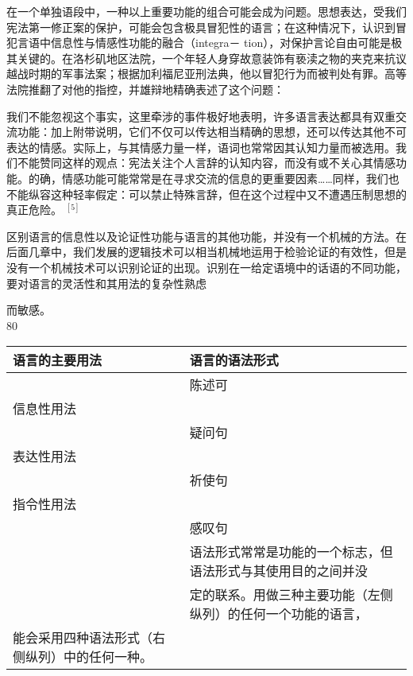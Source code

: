 在一个单独语段中，一种以上重要功能的组合可能会成为问题。思想表达，受我们宪法第一修正案的保护，可能会包含极具冒犯性的语言；在这种情况下，认识到冒犯言语中信息性与情感性功能的融合（integra－ tion），对保护言论自由可能是极其关键的。在洛杉矶地区法院，一个年轻人身穿故意装饰有亵渎之物的夹克来抗议越战时期的军事法案；根据加利福尼亚刑法典，他以冒犯行为而被判处有罪。高等法院推翻了对他的指控，并雄辩地精确表述了这个问题：

我们不能忽视这个事实，这里牵涉的事件极好地表明，许多语言表达都具有双重交流功能：加上附带说明，它们不仅可以传达相当精确的思想，还可以传达其他不可表达的情感。实际上，与其情感力量一样，语词也常常因其认知力量而被选用。我们不能赞同这样的观点：宪法关注个人言辞的认知内容，而没有或不关心其情感功能。的确，情感功能可能常常是在寻求交流的信息的更重要因素……同样，我们也不能纵容这种轻率假定：可以禁止特殊言辞，但在这个过程中又不遭遇压制思想的真正危险。 ${ }^{[5]}$

区别语言的信息性以及论证性功能与语言的其他功能，并没有一个机械的方法。在后面几章中，我们发展的逻辑技术可以相当机械地运用于检验论证的有效性，但是没有一个机械技术可以识别论证的出现。识别在一给定语境中的话语的不同功能，要对语言的灵活性和其用法的复杂性熟虑

而敏感。\\
80

\begin{center}
\begin{tabular}{|l|l|}
\hline
语言的主要用法 & 语言的语法形式 \\
\hline
 & 陈述可 \\
\hline
信息性用法 &  \\
\hline
 & 疑问句 \\
\hline
表达性用法 &  \\
\hline
 & 祈使句 \\
\hline
指令性用法 &  \\
\hline
 & 感叹句 \\
\hline
 & 语法形式常常是功能的一个标志，但语法形式与其使用目的之间并没 \\
\hline
 & 定的联系。用做三种主要功能（左侧纵列）的任何一个功能的语言， \\
\hline
能会采用四种语法形式（右侧纵列）中的任何一种。 &  \\
\hline
\end{tabular}
\end{center}

